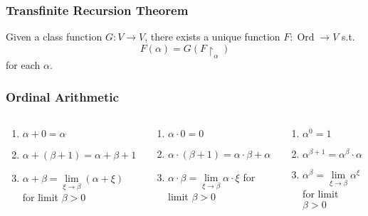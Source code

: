 \documentclass[UTF8,aspectratio=43,11pt,colorlinks,compress,openany]{beamer}%
\begin{document}
\begin{frame}\frametitle{Transfinite Recursion Theorem}
	\begin{theorem}
		Given a class function $G: V\to V$, there exists a unique function $F: \operatorname{Ord}\to V$ s.t.
		\[F(\alpha)=G(F{\restriction_\alpha})\]
		for each $\alpha$.
	\end{theorem}
\end{frame}

\begin{frame}\frametitle{Ordinal Arithmetic}\vspace{-8pt}
\setlength\abovedisplayskip{0pt}
\setlength\belowdisplayskip{0pt}
	\begin{columns}
			\begin{definition}[Addition]
				\begin{enumerate}
					\item $\alpha+0=\alpha$
					\item $\alpha+(\beta+1)=\alpha+\beta+1$
					\item $\alpha+\beta=\lim\limits_{\xi\to\beta}(\alpha+\xi)$ for limit $\beta>0$
				\end{enumerate}
			\end{definition}\vspace{-1ex}
			\begin{definition}[Multiplication]
				\begin{enumerate}
					\item $\alpha\cdot 0=0$
					\item $\alpha\cdot(\beta+1)=\alpha\cdot\beta+\alpha$
					\item $\alpha\cdot\beta=\lim\limits_{\xi\to\beta}\alpha\cdot\xi$ for limit $\beta>0$
				\end{enumerate}
			\end{definition}\vspace{-1ex}
			\begin{definition}[Exponentiation]
				\begin{enumerate}
					\item $\alpha^0=1$
					\item $\alpha^{\beta+1}=\alpha^\beta\cdot\alpha$
					\item $\alpha^\beta=\lim\limits_{\xi\to\beta}\alpha^\xi$ for limit $\beta>0$
				\end{enumerate}
			\end{definition}
			\resizebox{.8\textwidth}{!}{
				\begin{minipage}{\textwidth}

\end{minipage}}
\end{columns}
\end{frame}
\end{document}
